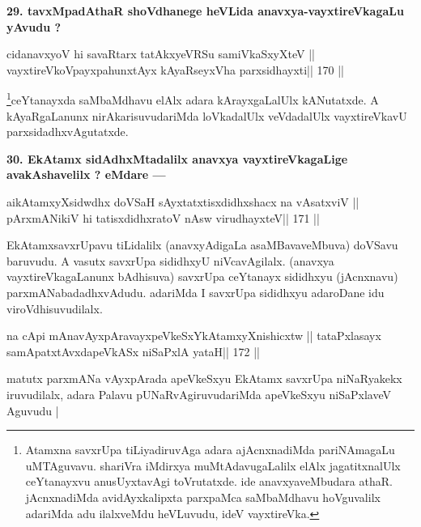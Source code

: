 \begin{artha}
{\bf 29. tavxMpadAthaR shoVdhanege heVLida anavxya-vayxtireVkagaLu yAvudu ?}
\end{artha}

\begin{shl}
cidanavxyoV hi savaRtarx tatAkxyeVRSu samiVkaSxyXteV ||
vayxtireVkoV\s payxpahunxtAyx kAyaRseyxVha parxsidhayxti\hfill || 170 ||
\end{shl}

\begin{artha}
\footnote[11]{Atamxna savxrUpa tiLiyadiruvAga adara ajAcnxnadiMda 
pariNAmagaLu uMTAguvavu. shariVra iMdirxya muMtAdavugaLalilx elAlx 
jagatitxnalUlx ceYtanayxvu anusUyxtavAgi toVrutatxde. ide 
anavxyaveMbudara athaR. jAcnxnadiMda avidAyxkalipxta parxpaMca 
saMbaMdhavu hoVguvalilx adariMda adu ilalxveMdu heVLuvudu, ideV vayxtireVka.}ceYtanayxda saMbaMdhavu elAlx adara kArayxgaLalUlx kANutatxde. A kAyaRgaLanunx nirAkarisuvudariMda loVkadalUlx veVdadalUlx vayxtireVkavU parxsidadhxvAgutatxde.
\end{artha}

\begin{artha}
{\bf 30. EkAtamx sidAdhxMtadalilx anavxya vayxtireVkagaLige avakAshavelilx ? eMdare ---}
\end{artha}

\begin{shl}
aikAtamxyXsidwdhx doVSaH sAyxtatxtisxdidhxshacx na vAsatxviV ||
pArxmANikiV hi tatisxdidhxratoV nAsw virudhayxteV\hfill || 171 ||
\end{shl}

\begin{artha}
EkAtamxsavxrUpavu tiLidalilx (anavxyAdigaLa asaMBavaveMbuva) doVSavu 
baruvudu. A vasutx savxrUpa sididhxyU niVcavAgilalx. (anavxya 
vayxtireVkagaLanunx bAdhisuva) savxrUpa ceYtanayx sididhxyu (jAcnxnavu) parxmANabadadhxvAdudu. adariMda I savxrUpa sididhxyu adaroDane idu viroVdhisuvudilalx.
\end{artha}

\begin{shl}
na cApi mAnavAyxpAravayxpeVkeSxYkAtamxyXnishicxtw ||
tataPxlasayx samApatxtAvxdapeVkASx niSaPxlA yataH\hfill || 172 ||
\end{shl}

\begin{artha}
matutx parxmANa vAyxpArada apeVkeSxyu EkAtamx savxrUpa niNaRyakekx iruvudilalx, adara Palavu pUNaRvAgiruvudariMda apeVkeSxyu niSaPxlaveV Aguvudu |
\end{artha}

